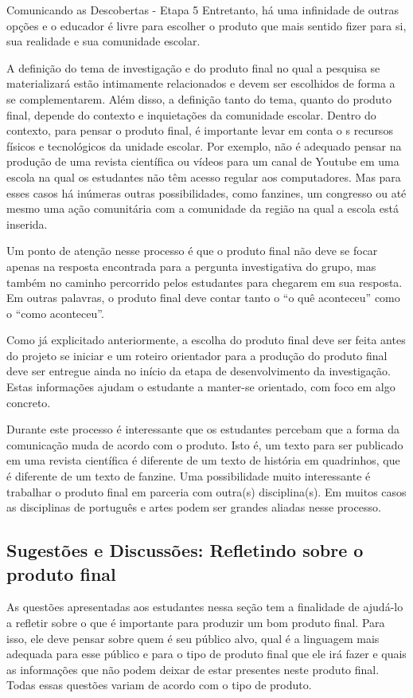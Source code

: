 \begin{paginatexto}{Comunicando as Descobertas - Etapa 5}
Entretanto, há uma infinidade de outras opções e o educador é livre para escolher o produto que mais sentido fizer para si, sua realidade e sua comunidade escolar. 

A definição do tema de investigação e do produto final no qual a pesquisa se materializará estão intimamente relacionados e devem ser escolhidos de forma a se complementarem. Além disso, a definição tanto do tema, quanto do produto final, depende do contexto e inquietações da comunidade escolar. Dentro do contexto, para pensar o produto final, é importante levar em conta o s recursos físicos e tecnológicos da unidade escolar. Por exemplo, não é adequado pensar na produção de uma revista científica ou vídeos para um canal de Youtube em uma escola na qual os estudantes não têm acesso regular aos computadores. Mas para esses casos há inúmeras outras possibilidades, como fanzines, um congresso ou até mesmo uma ação comunitária com a comunidade da região na qual a escola está inserida. 

Um ponto de atenção nesse processo é que o produto final não deve se focar apenas na resposta encontrada para a pergunta investigativa do grupo, mas também no caminho percorrido pelos estudantes para chegarem em sua resposta. Em outras palavras, o produto final deve contar tanto o “o quê aconteceu” como o “como aconteceu”.

Como já explicitado anteriormente, a escolha do produto final deve ser feita antes do projeto se iniciar e um roteiro orientador para a produção do produto final deve ser entregue ainda no início da etapa de desenvolvimento da investigação. Estas informações ajudam o estudante a manter-se orientado, com foco em algo concreto. 

Durante este processo é interessante que os estudantes percebam que a forma da comunicação muda de acordo com o produto. Isto é, um texto para ser publicado em uma revista científica é diferente de um texto de história em quadrinhos, que é diferente de um texto de fanzine. Uma possibilidade muito interessante é trabalhar o produto final em parceria com outra(s) disciplina(s). Em muitos casos as disciplinas de português e artes podem ser grandes aliadas nesse processo. 

\subsection{Sugestões e Discussões: Refletindo sobre o produto final}

As questões apresentadas aos estudantes nessa seção tem a finalidade de ajudá-lo a refletir sobre o que é importante para produzir um bom produto final. Para isso, ele deve pensar sobre quem é seu público alvo, qual é a linguagem mais adequada para esse público e para o tipo de produto final que ele irá fazer e quais as informações que não podem deixar de estar presentes neste produto final. Todas essas questões variam de acordo com o tipo de produto.


\end{paginatexto}
